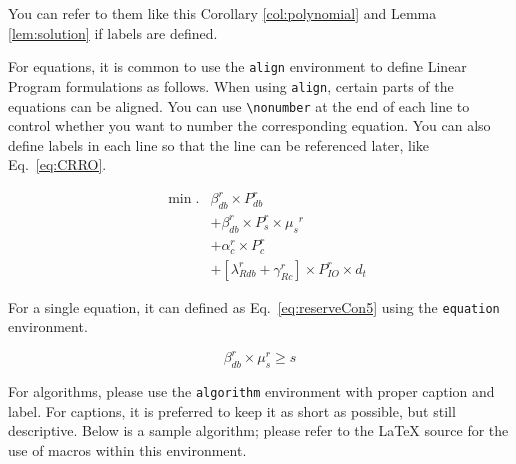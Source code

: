 You can refer to them like this Corollary \ref{col:polynomial} and Lemma \ref{lem:solution} if labels are defined.
 
For equations, it is common to use the \texttt{align} environment to define Linear Program formulations as follows. When using \texttt{align}, certain parts of the equations can be aligned. You can use \texttt{\textbackslash nonumber} at the end of each line to control whether you want to number the corresponding equation. You can also define labels in each line so that the line can be referenced later, like Eq.~\ref{eq:CRRO}.

\begin{eqnarray}
\label{eq:CRRO} 
		&\min. &{\beta^r_{db}} \times {P^r_{db}} \nonumber\\
		&      & + {\beta^r_{db}} \times {P^r_{s}} \times {\mu_{s}}^r \\
		&      & + {\alpha^r _{c}}\times {P^r_{c}} \nonumber\\
		&      & + [{\lambda^r_{Rdb}} + {\gamma^r_{Rc}}] \times {P^r_{IO}} \times d_t \nonumber
\end{eqnarray}

For a single equation, it can defined as Eq.~\ref{eq:reserveCon5} using the \texttt{equation} environment.

\begin{equation}
\label{eq:reserveCon5}
{\beta^r_{db}}\times {\mu^r_{s}}\geq  {s} 
\end{equation}

For algorithms, please use the \texttt{algorithm} environment with proper caption and label.  For captions, it is preferred to keep it as short as possible, but still descriptive.  Below is a sample algorithm; please refer to the LaTeX source for the use of macros within this environment.

